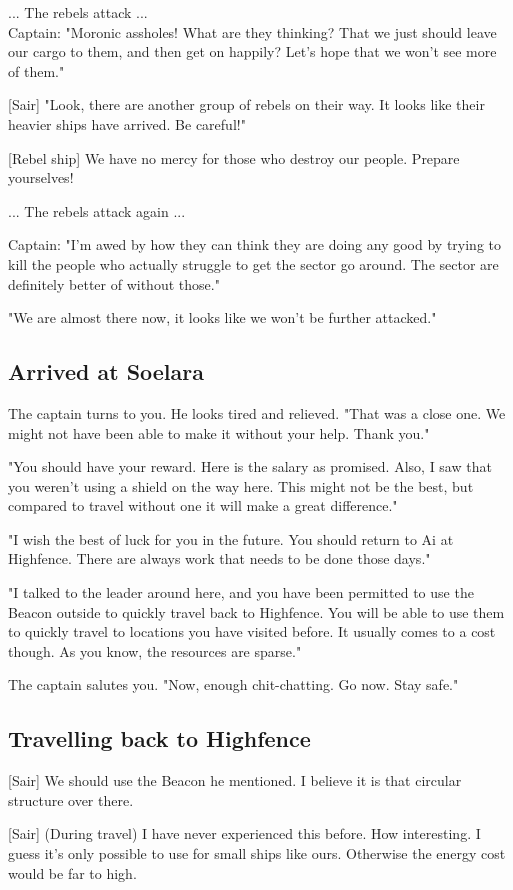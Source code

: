 \documentclass[a4paper,12pt]{article}
\begin{document}
... The rebels attack ...\\

Captain: "Moronic assholes! What are they thinking? That we just should leave
our cargo to them, and then get on happily? Let's hope that we won't see more of them."

[Sair] "Look, there are another group of rebels on their way. It looks like
their heavier ships have arrived. Be careful!"

[Rebel ship] We have no mercy for those who destroy our people. 
Prepare yourselves!

... The rebels attack again ...

Captain: "I'm awed by how they can think they are doing any good by trying
to kill the people who actually struggle to get the sector go around.
The sector are definitely better of without those."

"We are almost there now, it looks like we won't be further attacked."

\subsection{Arrived at Soelara}

The captain turns to you. He looks tired and relieved. "That was a close one.
We might not have been able to make it without your help. Thank you."

"You should have your reward. Here is the salary as promised. Also, I saw that you weren't using a shield on the way here. This might not be the best, but compared to travel without one it will make a great difference."

"I wish the best of luck for you in the future. You should return to Ai at
Highfence. There are always work that needs to be done those days."

"I talked to the leader around here, and you have been permitted to use the Beacon outside to quickly travel back to Highfence. You will be able to use them to quickly travel to locations you have visited before. It usually comes to a cost though. As you know, the resources are sparse."

The captain salutes you. "Now, enough chit-chatting. Go now. Stay safe."

\subsection{Travelling back to Highfence}

[Sair] We should use the Beacon he mentioned. I believe it is that circular
structure over there.

[Sair] (During travel) I have never experienced this before. How interesting.
I guess it's only possible to use for small ships like ours. Otherwise the
energy cost would be far to high.
\end{document}

